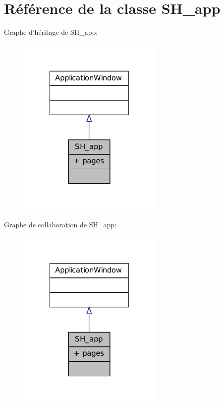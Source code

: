 \hypertarget{classSH__app}{\section{Référence de la classe S\-H\-\_\-app}
\label{classSH__app}
}


Graphe d'héritage de S\-H\-\_\-app\-:
\nopagebreak
\begin{figure}[H]
\begin{center}
\leavevmode
\includegraphics[width=198pt]{classSH__app__inherit__graph}
\end{center}
\end{figure}


Graphe de collaboration de S\-H\-\_\-app\-:
\nopagebreak
\begin{figure}[H]
\begin{center}
\leavevmode
\includegraphics[width=198pt]{classSH__app__coll__graph}
\end{center}
\end{figure}
